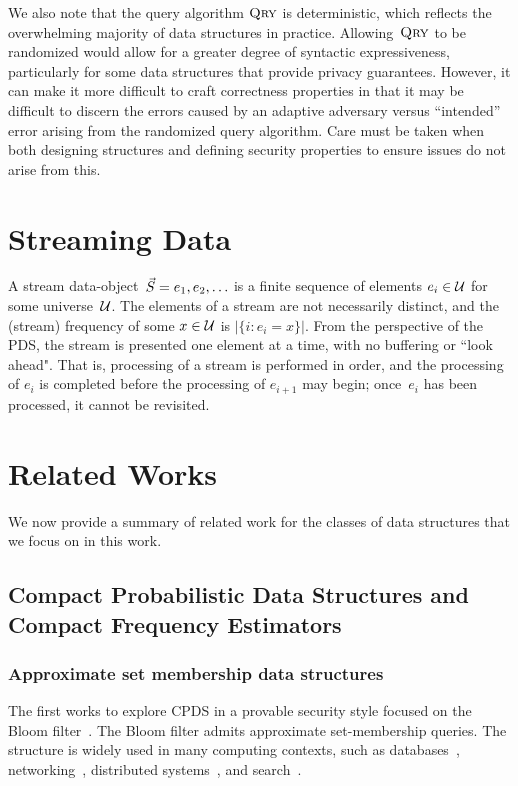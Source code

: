 We also note that the query algorithm $\textnormal{\textsc{Qry}}$ is deterministic, which reflects the overwhelming majority of data structures in practice. Allowing~$\textnormal{\textsc{Qry}}$ to be randomized would allow for a greater degree of syntactic expressiveness, particularly for some data structures that provide privacy guarantees. However, it can make it more difficult to craft correctness properties in that it may be difficult to discern the errors caused by an adaptive adversary versus ``intended'' error arising from the randomized query algorithm. Care must be taken when both designing structures and defining security properties to ensure issues do not arise from this.  

\section{Streaming Data}

A stream data-object~$\vec{S} = e_1,e_2,\ldots$ is a finite sequence of elements $e_i \in \mathcal{U}$ for some universe~$\mathcal{U}$.  
The elements of a stream are not necessarily distinct, and the (stream) frequency of some $x \in \mathcal{U}$ is $|\{i: e_i=x \}|$.  
From the perspective of the PDS, the stream is presented one element at a time, with no buffering or ``look ahead".  
That is, processing of a stream is performed in order, and the processing of $e_i$ is completed before the processing of $e_{i+1}$ may begin; once~$e_i$ has been processed, it cannot be revisited.

\section{Related Works}

We now provide a summary of related work for the classes of data structures that we focus on in this work.

\subsection{Compact Probabilistic Data Structures and Compact Frequency Estimators}

\subsubsection{Approximate set membership data structures}

The first works to explore CPDS in a provable security style focused on the Bloom filter~\cite{bloom1970space}. The Bloom filter admits approximate set-membership queries. The structure is widely used in many computing contexts, such as databases~\cite{chang2008bigtable}, networking~\cite{broder2004network}, distributed systems~\cite{tarkoma2011theory}, and search~\cite{goodwin2017bitfunnel}. 

